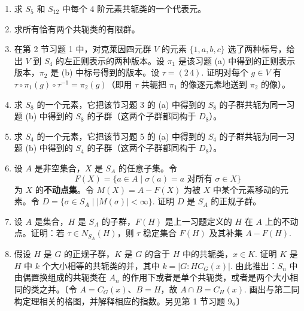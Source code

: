 \begin{enumerate}
（a）\(\sigma_1 = (1\,2)(3\,4\,5)\) 和 \(\sigma_2 = (1\,2\,3)(4\,5)\)；

（b）\(\sigma_1 = (1\,5)(3\,7\,2)(10\,6\,8\,11)\) 和 \(\sigma_2 = (3\,7\,5\,10)(4\,9)(13\,11\,2)\)；

（c）\(\sigma_1 = (1\,5)(3\,7\,2)(10\,6\,8\,11)\) 和 \(\sigma_2 = \sigma_1^2\)；

（d）\(\sigma_1 = (1\,3)(2\,4\,6)\) 和 \(\sigma_2 = (3\,5)(2\,4)(5\,6)\).

\item 求 \(S_5\) 和 \(S_{12}\) 中每个 4 阶元素共轭类的一个代表元。

\item 求所有恰有两个共轭类的有限群。

\item 在第 2 节习题 1 中，对克莱因四元群 \(V\) 的元素 \(\{1, a, b, c\}\) 选了两种标号，给出 \(V\) 到 \(S_4\) 的左正则表示的两种版本。设 \(\pi_1\) 是该习题 (a) 中得到的正则表示版本，\(\pi_2\) 是 (b) 中标号得到的版本。设 \(\tau = (2\,4)\). 证明对每个 \(g \in V\) 有 \(\tau \circ \pi_1(g) \circ \tau^{-1} = \pi_2(g)\)（即用 \(\tau\) 共轭把 \(\pi_1\) 的像逐元素地送到 \(\pi_2\) 的像）。

\item 求 \(S_8\) 的一个元素，它把该节习题 3 的 (a) 中得到的 \(S_8\) 的子群共轭为同一习题 (b) 中得到的 \(S_8\) 的子群（这两个子群都同构于 \(D_8\)）。

\item 求 \(S_4\) 的一个元素，它把该节习题 5 的 (a) 中得到的 \(S_4\) 的子群共轭为同一习题 (b) 中得到的 \(S_4\) 的子群（这两个子群都同构于 \(D_8\)）。

\item 设 \(A\) 是非空集合，\(X\) 是 \(S_A\) 的任意子集。令
\[
F(X) = \{a \in A \mid \sigma(a) = a \text{ 对所有 } \sigma \in X\}
\]
为 \(X\) 的\textbf{不动点集}。令 \(M(X) = A - F(X)\) 为被 \(X\) 中某个元素移动的元素。令 \(D = \{\sigma \in S_A \mid |M(\sigma)| < \infty\}\). 证明 \(D\) 是 \(S_A\) 的正规子群。

\item 设 \(A\) 是集合，\(H\) 是 \(S_A\) 的子群，\(F(H)\) 是上一习题定义的 \(H\) 在 \(A\) 上的不动点。证明：若 \(\tau \in N_{S_A}(H)\)，则 \(\tau\) 稳定集合 \(F(H)\) 及其补集 \(A - F(H)\).

\item 假设 \(H\) 是 \(G\) 的正规子群，\(K\) 是 \(G\) 的含于 \(H\) 中的共轭类，\(x \in K\). 证明 \(K\) 是 \(H\) 中 \(k\) 个大小相等的共轭类的并，其中 \(k = |G : HC_G(x)|\). 由此推出：\(S_n\) 中由偶置换组成的共轭类在 \(A_n\) 的作用下或者是单个共轭类，或者是两个大小相同的类之并。〔令 \(A = C_G(x)\)、\(B = H\)，故 \(A \cap B = C_H(x)\). 画出与第二同构定理相关的格图，并解释相应的指数。另见第 1 节习题 9。〕


\end{enumerate}
